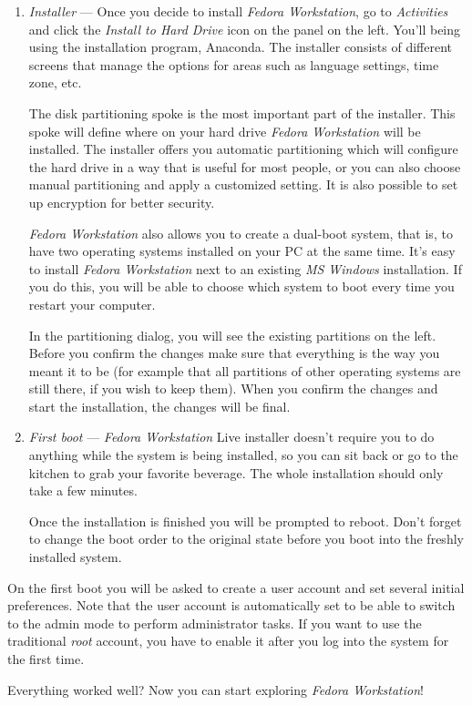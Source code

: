 \begin{enumerate}
\item\emph{Installer} --- Once you decide to install \emph{Fedora Workstation}, go to \emph{Activities} and click the \emph{Install to Hard Drive} icon on the panel on the left. You'll being using the installation program, Anaconda. The installer consists of different screens that manage the options for areas such as language settings, time zone, etc.

The disk partitioning spoke is the most important part of the installer. This spoke will define where on your hard drive \emph{Fedora Workstation} will be installed. The installer offers you automatic partitioning which will configure the hard drive in a way that is useful for most people, or you can also choose manual partitioning and apply a customized setting. It is also possible to set up encryption for better security.

\emph{Fedora Workstation} also allows you to create a dual-boot system, that is, to have two operating systems installed on your PC at the same time. It's easy to install \emph{Fedora Workstation} next to an existing \emph{MS Windows} installation. If you do this, you will be able to choose which system to boot every time you restart your computer.

In the partitioning dialog, you will see the existing partitions on the left. Before you confirm the changes make sure that everything is the way you meant it to be (for example that all partitions of other operating systems are still there, if you wish to keep them). When you confirm the changes and start the installation, the changes will be final.

\item\emph{First boot} --- \emph{Fedora Workstation} Live installer doesn't require you to do anything while the system is being installed, so you can sit back or go to the kitchen to grab your favorite beverage. The whole installation should only take a few minutes.

Once the installation is finished you will be prompted to reboot. Don't forget to change the boot order to the original state before you boot into the freshly installed system.
\end{enumerate}

On the first boot you will be asked to create a user account and set several initial preferences. Note that the user account is automatically set to be able to switch to the admin mode to perform administrator tasks. If you want to use the traditional \emph{root} account, you have to enable it after you log into the system for the first time.

Everything worked well? Now you can start exploring \emph{Fedora Workstation}!
\endinput
